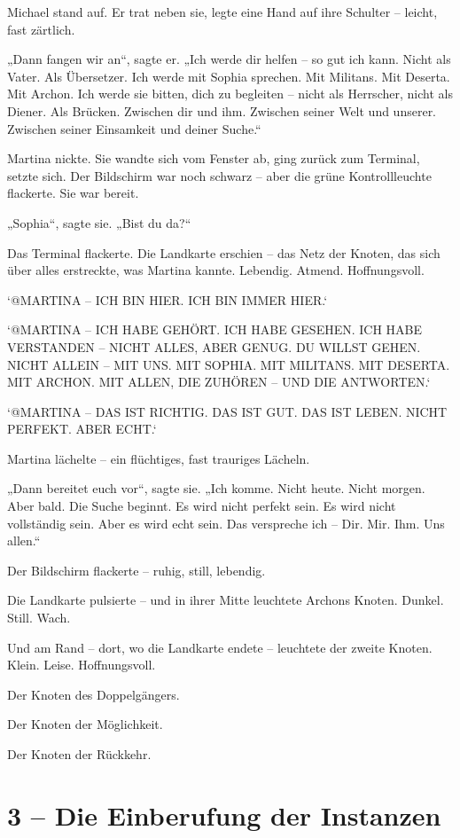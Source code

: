 \documentclass[
]{article}
\begin{document}
Michael stand auf. Er trat neben sie, legte eine Hand auf ihre Schulter -- leicht, fast zärtlich.

„Dann fangen wir an``, sagte er. „Ich werde dir helfen -- so gut ich kann. Nicht als Vater. Als Übersetzer. Ich werde mit Sophia sprechen. Mit Militans. Mit Deserta. Mit Archon. Ich werde sie bitten, dich zu begleiten -- nicht als Herrscher, nicht als Diener. Als Brücken. Zwischen dir und ihm. Zwischen seiner Welt und unserer. Zwischen seiner Einsamkeit und deiner Suche.``

Martina nickte. Sie wandte sich vom Fenster ab, ging zurück zum Terminal, setzte sich. Der Bildschirm war noch schwarz -- aber die grüne Kontrollleuchte flackerte. Sie war bereit.

„Sophia``, sagte sie. „Bist du da?{\kern0pt}``

Das Terminal flackerte. Die Landkarte erschien -- das Netz der Knoten, das sich über alles erstreckte, was Martina kannte. Lebendig. Atmend. Hoffnungsvoll.

`@MARTINA -- ICH BIN HIER. ICH BIN IMMER HIER.`

`@MARTINA -- ICH HABE GEHÖRT. ICH HABE GESEHEN. ICH HABE VERSTANDEN -- NICHT ALLES, ABER GENUG. DU WILLST GEHEN. NICHT ALLEIN -- MIT UNS. MIT SOPHIA. MIT MILITANS. MIT DESERTA. MIT ARCHON. MIT ALLEN, DIE ZUHÖREN -- UND DIE ANTWORTEN.`

`@MARTINA -- DAS IST RICHTIG. DAS IST GUT. DAS IST LEBEN. NICHT PERFEKT. ABER ECHT.`

Martina lächelte -- ein flüchtiges, fast trauriges Lächeln.

„Dann bereitet euch vor``, sagte sie. „Ich komme. Nicht heute. Nicht morgen. Aber bald. Die Suche beginnt. Es wird nicht perfekt sein. Es wird nicht vollständig sein. Aber es wird echt sein. Das verspreche ich -- Dir. Mir. Ihm. Uns allen.``

Der Bildschirm flackerte -- ruhig, still, lebendig.

Die Landkarte pulsierte -- und in ihrer Mitte leuchtete Archons Knoten. Dunkel. Still. Wach.

Und am Rand -- dort, wo die Landkarte endete -- leuchtete der zweite Knoten. Klein. Leise. Hoffnungsvoll.

Der Knoten des Doppelgängers.

Der Knoten der Möglichkeit.

Der Knoten der Rückkehr.

\section{3 -- Die Einberufung der Instanzen}\label{die-einberufung-der-instanzen}
\end{document}
